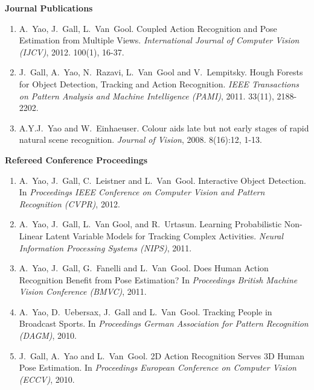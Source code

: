 \begin{publications}


{\large\textbf{Journal Publications}} \\
\begin{enumerate}

\item 
A.~Yao, J.~Gall, L.~Van~Gool.  Coupled Action Recognition and Pose Estimation
from Multiple Views.  {\em International Journal of Computer Vision (IJCV)},
2012.  100(1), 16-37.

\item 
J.~Gall, A.~Yao, N.~Razavi, L.~Van~Gool and V.~Lempitsky. Hough Forests for
Object Detection, Tracking and Action Recognition.  {\em IEEE Transactions on
Pattern Analysis and Machine Intelligence (PAMI)}, 2011.  33(11), 2188-2202.

\item
A.Y.J.~Yao and W.~Einhaeuser.  Colour aids late but not early stages of rapid
natural scene recognition.  {\em Journal of Vision}, 2008. 8(16):12, 1-13. \\
\end{enumerate}

{\large\textbf{Refereed Conference Proceedings}} \\
\begin{enumerate}
\item
A.~Yao, J.~Gall, C.~Leistner and L.~Van~Gool.  Interactive Object Detection. 
In {\em Proceedings IEEE Conference on Computer Vision
and Pattern Recognition (CVPR)}, 2012. 

\item
A.~Yao, J.~Gall, L.~Van Gool, and R.~Urtasun.  Learning Probabilistic Non-Linear
Latent Variable Models for Tracking Complex Activities.  {\em Neural
Information Processing Systems (NIPS)}, 2011.

\item
A.~Yao, J.~Gall, G.~Fanelli and L.~Van~Gool. Does Human Action
Recognition Benefit from Pose Estimation? In {\em Proceedings British Machine
Vision Conference (BMVC)}, 2011.

\item
A.~Yao, D.~Uebersax, J.~Gall and L.~Van~Gool.  Tracking People in Broadcast
Sports. In {\em Proceedings German Association for Pattern Recognition (DAGM)},
2010.

\item
J.~Gall, A.~Yao and L.~Van~Gool.  2D Action Recognition Serves 3D Human Pose
Estimation.  In {\em Proceedings European Conference on Computer Vision (ECCV)},
2010.


\end{enumerate}
\end{publications}

